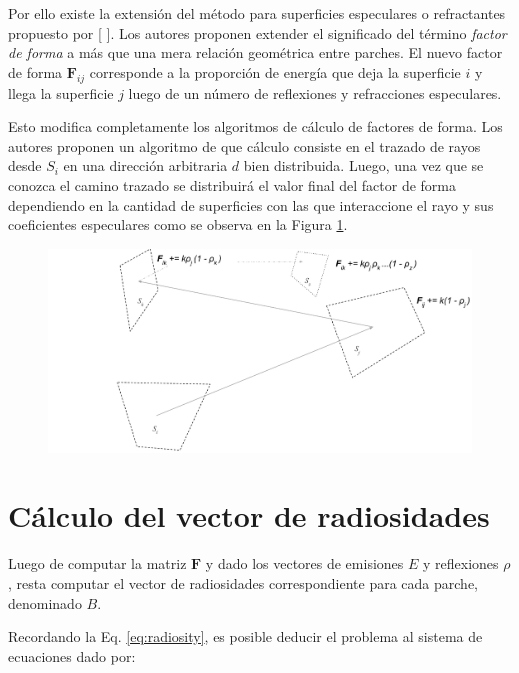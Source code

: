 Por ello existe la extensión del método para superficies especulares o refractantes propuesto por [\citeauthor{Sillion} \cite{Sillion}]. Los autores proponen extender el significado del término \textit{factor de forma} a más que una mera relación geométrica entre parches. El nuevo factor de forma $\mathbf{F}_{ij}$ corresponde a la proporción de energía que deja la superficie $i$ y llega la superficie $j$ luego de un número de reflexiones y refracciones especulares.

Esto modifica completamente los algoritmos de cálculo de factores de forma. Los autores proponen un algoritmo de  que cálculo consiste en el trazado de rayos desde $S_{i}$ en una dirección arbitraria $d$ bien distribuida.  Luego, una vez que se conozca el camino trazado se distribuirá el valor final del factor de forma dependiendo en la cantidad de superficies con las que interaccione el rayo y sus coeficientes especulares como se observa en la Figura \ref{img:caminoespecular}.

\vspace{5mm}
\begin{figure}[H]
	\includegraphics[width=1\linewidth]{assets/extended}
	\label{img:caminoespecular}
\end{figure}

\section{Cálculo del vector de radiosidades}
\label{sec:vrad}

Luego de computar la matriz $\mathbf{F}$ y dado los vectores de emisiones $E$ y reflexiones $\rho$, resta computar el vector de radiosidades correspondiente para cada parche, denominado $B$.

Recordando la Eq. \eqref{eq:radiosity}, es posible deducir el problema al sistema de ecuaciones dado por:

